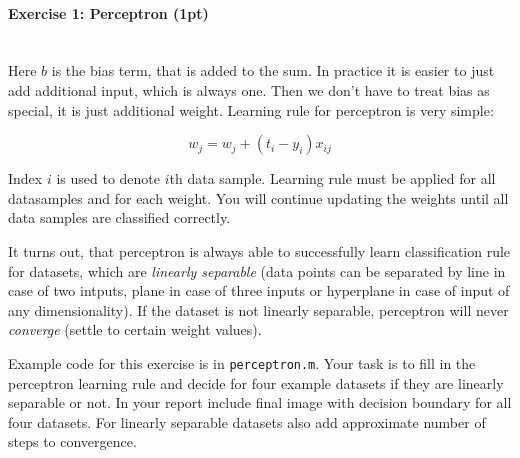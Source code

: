 \documentclass[a4paper,11pt]{article}
\newenvironment{exercise}[3]{\paragraph{Exercise #1: #2 (#3pt)}\ \\}{
\medskip}
\begin{document}
\begin{exercise}{1}{Perceptron}{1}
Here $b$ is the bias term, that is added to the sum. In practice it is easier to just add additional input, which is always one. Then we don’t have to treat bias as special, it is just additional weight. Learning rule for perceptron is very simple:

$$
w_j = w_j + (t_i - y_i) x_{ij}
$$

Index $i$ is used to denote $i$th data sample. Learning rule must be applied for all datasamples and for each weight. You will continue updating the weights until all data samples are classified correctly.

It turns out, that perceptron is always able to successfully learn classification rule for datasets, which are \textit{linearly separable} (data points can be separated by line in case of two intputs, plane in case of three inputs or hyperplane in case of input of any dimensionality). If the dataset is not linearly separable, perceptron will never \textit{converge} (settle to certain weight values). \newline

Example code for this exercise is in \texttt{perceptron.m}. Your task is to fill in the perceptron learning rule and decide for four example datasets if they are linearly separable or not. In your report include final image with decision boundary for all four datasets. For linearly separable datasets also add approximate number of steps to convergence.

\end{exercise}
\end{document}
